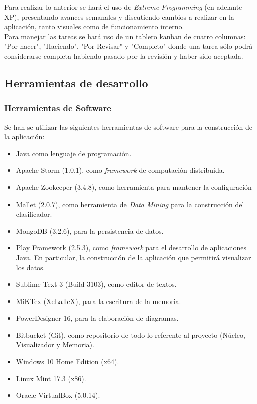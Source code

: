 Para realizar lo anterior se hará el uso de \textit{Extreme Programming} (en adelante XP), presentando avances semanales y discutiendo cambios a realizar en la aplicación, tanto visuales como de funcionamiento interno.\\

Para manejar las tareas se hará uso de un tablero kanban de cuatro columnas: "Por hacer", "Haciendo", "Por Revisar" y "Completo" donde una tarea sólo podrá considerarse completa habiendo pasado por la revisión y haber sido aceptada.

\subsection{Herramientas de desarrollo}
\label{subsec:HerrDesarrollo}

\subsubsection{Herramientas de Software}
\label{subsubsec:HerrSoftware}

Se han se utilizar las siguientes herramientas de software para la construcción de la aplicación:\\

\begin{itemize}
\item Java como lenguaje de programación.
\item Apache Storm (1.0.1), como \textit{framework} de computación distribuida.
\item Apache Zookeeper (3.4.8), como herramienta para mantener la configuración
\item Mallet (2.0.7), como herramienta de \textit{Data Mining} para la construcción del clasificador.
\item MongoDB (3.2.6), para la persistencia de datos.
\item Play Framework (2.5.3), como \textit{framework} para el desarrollo de aplicaciones Java. En particular, la construcción de la aplicación que permitirá visualizar los datos. 
\item Sublime Text 3 (Build 3103), como editor de textos.
\item MiKTex (XeLaTeX), para la escritura de la memoria.
\item PowerDesigner 16, para la elaboración de diagramas.
\item Bitbucket (Git), como repositorio de todo lo referente al proyecto (Núcleo, Visualizador y Memoria).
\item Windows 10 Home Edition (x64).
\item Linux Mint 17.3 (x86).
\item Oracle VirtualBox (5.0.14).
\end{itemize}

